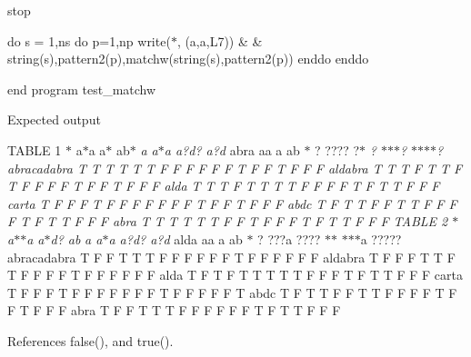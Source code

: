 stop

do s = 1,ns do p=1,np write($\ast$, \textquotesingle{}(a,a,L7)\textquotesingle{}) \& \& string(s),pattern2(p),matchw(string(s),pattern2(p)) enddo enddo

end program test\+\_\+matchw

Expected output

T\+A\+B\+LE 1 $\ast$ a$\ast$a a$\ast$ ab$\ast$ {\itshape a a$\ast$a a?d? a?d} abra aa a ab $\ast$ ? ???? ?$\ast$ {\itshape ? $\ast$$\ast$$\ast$? $\ast$$\ast$$\ast$$\ast$? abracadabra T T T T T T F F F F F F T F F T F F F aldabra T T T F T T F T F F F F T F F T F F F alda T T T F T T T T F F F F T F T T F F F carta T F F F T F F F F F F F T F F T F F F abdc T F T T F F T T F F F F T F T T F F F abra T T T T T T F F T F F F T F T T F F F T\+A\+B\+LE 2 $\ast$ a$\ast$$\ast$a a$\ast$d? ab} {\itshape a a$\ast$a a?d? a?d} alda aa a ab $\ast$ ? ???a ???? $\ast$$\ast$ $\ast$$\ast$$\ast$a ????? abracadabra T F F T T T F F F F F F T F F F F F F aldabra T F F F T T F T F F F F T F F F F F F alda T F T F T T T T T F F F T F T T F F F carta T F F F T F F F F F F F T F F F F F T abdc T F T T F F T T F F F F T F F T F F F abra T F F T T T F F F F F F T F T T F F F 

References false(), and true().

